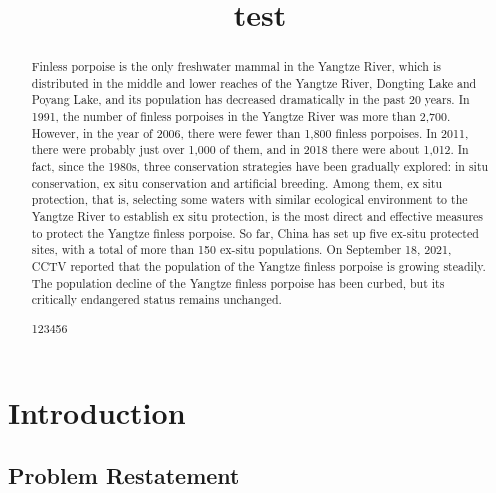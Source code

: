 \documentclass{mcmthesis}
\title{test}
\numberwithin{figure}{section}
\numberwithin{table}{section}
\numberwithin{equation}{section}
\begin{document}
\begin{abstract}
  Finless porpoise is the only freshwater mammal in the Yangtze River, 
  which is distributed in the middle and lower reaches of the Yangtze 
  River, Dongting Lake and Poyang Lake, and its population has 
  decreased dramatically in the past 20 years. In 1991, the number of 
  finless porpoises in the Yangtze River was more than 2,700. However,  
  in the year of 2006, there were fewer than 1,800 finless porpoises. 
  In 2011, there were probably just over 1,000 of them, 
  and in 2018 there were about 1,012. In fact, since the 1980s, 
  three conservation strategies have been gradually explored: 
  in situ conservation, ex situ conservation and artificial breeding. 
  Among them, ex situ protection, that is, selecting some waters with 
  similar ecological environment to the Yangtze River to establish 
  ex situ protection, is the most direct and effective measures 
  to protect the Yangtze finless porpoise. So far, China has set up 
  five ex-situ protected sites, with a total of more than 150 
  ex-situ populations. On September 18, 2021, CCTV reported that 
  the population of the Yangtze finless porpoise is growing steadily. 
  The population decline of the Yangtze finless porpoise has been 
  curbed, but its critically endangered status remains unchanged.


\begin{keywords}
123456
\end{keywords}
\end{abstract}
\maketitle

\tableofcontents
  \thispagestyle{empty}
  \newpage
  \setcounter{page}{1}

\section{Introduction}

\subsection{Problem Restatement}
\end{document}
